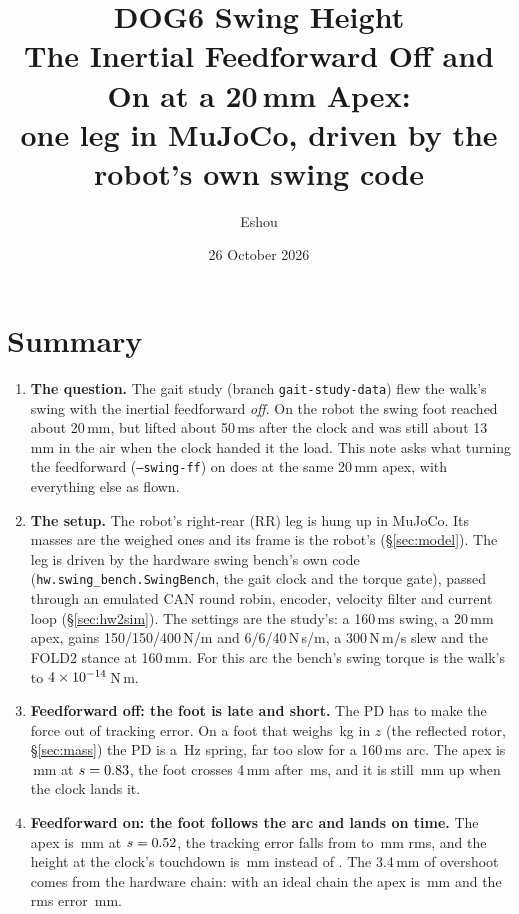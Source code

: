 \documentclass[11pt,a4paper]{article}
\title{\textbf{DOG6 Swing Height}\\[0.3em]
\large The Inertial Feedforward Off and On at a 20\,mm Apex:\\
one leg in MuJoCo, driven by the robot's own swing code}
\author{Eshou}
\date{26 October 2026}
\newcommand{\Nm}{\,N\,m}
\newcommand{\Nms}{\,N\,m/s}
\newcommand{\code}[1]{\texttt{#1}}
\begin{document}
\maketitle

\section*{Summary}

\begin{enumerate}[leftmargin=1.5em]
\item \textbf{The question.} The gait study (branch \code{gait-study-data})
flew the walk's swing with the inertial feedforward \emph{off}. On the robot the
swing foot reached about 20\,mm, but lifted about 50\,ms after the clock and was
still about 13\,mm in the air when the clock handed it the load. This note asks
what turning the feedforward (\code{--swing-ff}) on does at the same 20\,mm
apex, with everything else as flown.

\item \textbf{The setup.} The robot's right-rear (RR) leg is hung up in MuJoCo.
Its masses are the weighed ones and its frame is the robot's
(\S\ref{sec:model}). The leg is driven by the hardware swing bench's own code
(\code{hw.swing\_bench.SwingBench}, the gait clock and the torque gate), passed
through an emulated CAN round robin, encoder, velocity filter and current loop
(\S\ref{sec:hw2sim}). The settings are the study's: a 160\,ms swing, a 20\,mm
apex, gains 150/150/400\,N/m and 6/6/40\,N\,s/m, a 300\Nms{} slew and the
FOLD2 stance at 160\,mm. For this arc the bench's swing torque is the walk's
to $4\times10^{-14}$\Nm.

\item \textbf{Feedforward off: the foot is late and short.} The PD has to make
the force out of tracking error. On a foot that weighs \LamZ\,kg in $z$ (the
reflected rotor, \S\ref{sec:mass}) the PD is a \WnHz\,Hz spring, far too slow
for a 160\,ms arc. The apex is \ApexOff\,mm at $s=0.83$, the foot
crosses 4\,mm after \LagOff\,ms, and it is still \HtdOff\,mm up when the clock
lands it.

\item \textbf{Feedforward on: the foot follows the arc and lands on time.} The
apex is \ApexOn\,mm at $s=0.52$, the tracking error falls from \RmsOff{} to
\RmsOn\,mm rms, and the height at the clock's touchdown is \HtdOn\,mm instead
of \HtdOff. The 3.4\,mm of overshoot comes from the hardware chain: with an
ideal chain the apex is \ApexOnIdeal\,mm and the rms error \RmsOnIdeal\,mm.


\end{enumerate}
\end{document}

